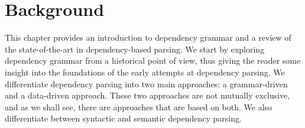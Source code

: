 \chapter{Background}
\label{chap:background}

This chapter provides an introduction to dependency grammar and a review of the state-of-the-art in 
dependency-based parsing. We start by exploring dependency grammar from a historical point of view,
thus giving the reader some insight into the foundations of the early attempts at dependency parsing.
We differentiate dependency parsing into two main approaches: a grammar-driven and a data-driven approach.
These two approaches are not mutually exclusive, and as we shall see, there are approaches that are based
on both. We also differentiate between syntactic and semantic dependency parsing. 